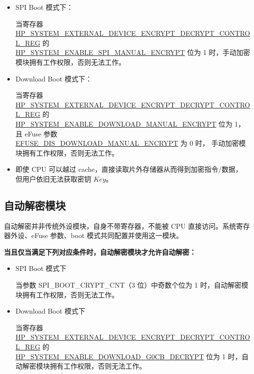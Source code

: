 \documentclass[main\_\_CN.tex]{subfiles}
\begin{document}
\begin{itemize}

    \item SPI Boot 模式下：

    当寄存器 \hyperref[regdesc:HPSYSTEMEXTERNALDEVICEENCRYPTDECRYPTCONTROLREG]{HP\_SYSTEM\_EXTERNAL\_DEVICE\_ENCRYPT\_DECRYPT\_CONTROL\_REG} 的 \\ \hyperref[fielddesc:HPSYSTEMENABLESPIMANUALENCRYPT]{HP\_SYSTEM\_ENABLE\_SPI\_MANUAL\_ENCRYPT} 位为 1 时，手动加密模块拥有工作权限，否则无法工作。

    \item Download Boot 模式下：

    当寄存器 \hyperref[regdesc:HPSYSTEMEXTERNALDEVICEENCRYPTDECRYPTCONTROLREG]{HP\_SYSTEM\_EXTERNAL\_DEVICE\_ENCRYPT\_DECRYPT\_CONTROL\_REG} 的\\ \hyperref[fielddesc:HPSYSTEMENABLEDOWNLOADMANUALENCRYPT]{HP\_SYSTEM\_ENABLE\_DOWNLOAD\_MANUAL\_ENCRYPT} 位为 1，且 eFuse 参数\\ \hyperref[fielddesc:EFUSEDISDOWNLOADMANUALENCRYPT]{EFUSE\_DIS\_DOWNLOAD\_MANUAL\_ENCRYPT} 为 0 时，
    手动加密模块拥有工作权限，否则无法工作。

\end{itemize}

\begin{tiplisting}
\vspace{-2em}
\begin{itemize}
\item 即使 CPU 可以越过 cache，直接读取片外存储器从而得到加密指令/数据，
但用户依旧无法获取密钥 \begin{math}\mathit{Key}\end{math}。
\end{itemize}
\end{tiplisting}


\subsection{自动解密模块}

自动解密并非传统外设模块，自身不带寄存器，不能被 CPU 直接访问。系统寄存器外设、eFuse 参数、boot 模式共同配置并使用这一模块。

\textbf{当且仅当满足下列对应条件时，自动解密模块才允许自动解密：}

\begin{itemize}

    \item SPI Boot 模式下

    当参数 SPI\_BOOT\_CRYPT\_CNT（3 位）中奇数个位为 1 时，自动解密模块拥有工作权限，否则无法工作。

    \item Download Boot 模式下

    当寄存器 \hyperref[regdesc:HPSYSTEMEXTERNALDEVICEENCRYPTDECRYPTCONTROLREG]{HP\_SYSTEM\_EXTERNAL\_DEVICE\_ENCRYPT\_DECRYPT\_CONTROL\_REG} 的 \\ \hyperref[fielddesc:HPSYSTEMENABLEDOWNLOADG0CBDECRYPT]{HP\_SYSTEM\_ENABLE\_DOWNLOAD\_G0CB\_DECRYPT} 位为 1 时，自动解密模块拥有工作权限，否则无法工作。

\end{itemize}
\end{document}
